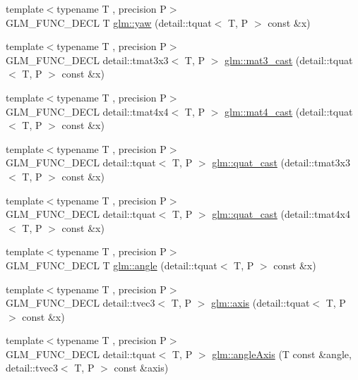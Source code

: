 \begin{DoxyCompactItemize}
\item 
{\footnotesize template$<$typename T , precision P$>$ }\\G\+L\+M\+\_\+\+F\+U\+N\+C\+\_\+\+D\+E\+CL T \hyperlink{group__gtc__quaternion_ga1de7653ddf380ff06d2300eea831664c}{glm\+::yaw} (detail\+::tquat$<$ T, P $>$ const \&x)
\item 
{\footnotesize template$<$typename T , precision P$>$ }\\G\+L\+M\+\_\+\+F\+U\+N\+C\+\_\+\+D\+E\+CL detail\+::tmat3x3$<$ T, P $>$ \hyperlink{group__gtc__quaternion_ga65257c3494022ad80a50ce11da95049d}{glm\+::mat3\+\_\+cast} (detail\+::tquat$<$ T, P $>$ const \&x)
\item 
{\footnotesize template$<$typename T , precision P$>$ }\\G\+L\+M\+\_\+\+F\+U\+N\+C\+\_\+\+D\+E\+CL detail\+::tmat4x4$<$ T, P $>$ \hyperlink{group__gtc__quaternion_gafc4e34c836f7ccb5f3bb2a0373c831e0}{glm\+::mat4\+\_\+cast} (detail\+::tquat$<$ T, P $>$ const \&x)
\item 
{\footnotesize template$<$typename T , precision P$>$ }\\G\+L\+M\+\_\+\+F\+U\+N\+C\+\_\+\+D\+E\+CL detail\+::tquat$<$ T, P $>$ \hyperlink{group__gtc__quaternion_gafb826745dedb1760100bbd25d0f63fde}{glm\+::quat\+\_\+cast} (detail\+::tmat3x3$<$ T, P $>$ const \&x)
\item 
{\footnotesize template$<$typename T , precision P$>$ }\\G\+L\+M\+\_\+\+F\+U\+N\+C\+\_\+\+D\+E\+CL detail\+::tquat$<$ T, P $>$ \hyperlink{group__gtc__quaternion_ga385af22ef1a45c4464ddd28b80d5ce18}{glm\+::quat\+\_\+cast} (detail\+::tmat4x4$<$ T, P $>$ const \&x)
\item 
{\footnotesize template$<$typename T , precision P$>$ }\\G\+L\+M\+\_\+\+F\+U\+N\+C\+\_\+\+D\+E\+CL T \hyperlink{group__gtc__quaternion_ga23a3fc7ada5bbb665ff84c92c6e0542c}{glm\+::angle} (detail\+::tquat$<$ T, P $>$ const \&x)
\item 
{\footnotesize template$<$typename T , precision P$>$ }\\G\+L\+M\+\_\+\+F\+U\+N\+C\+\_\+\+D\+E\+CL detail\+::tvec3$<$ T, P $>$ \hyperlink{group__gtc__quaternion_ga8eef9f8c3f2e4836dccf09df975b20fb}{glm\+::axis} (detail\+::tquat$<$ T, P $>$ const \&x)
\item 
{\footnotesize template$<$typename T , precision P$>$ }\\G\+L\+M\+\_\+\+F\+U\+N\+C\+\_\+\+D\+E\+CL detail\+::tquat$<$ T, P $>$ \hyperlink{group__gtc__quaternion_ga771b3e16cca8324e7111b923476be666}{glm\+::angle\+Axis} (T const \&angle, detail\+::tvec3$<$ T, P $>$ const \&axis)

\end{DoxyCompactItemize}
